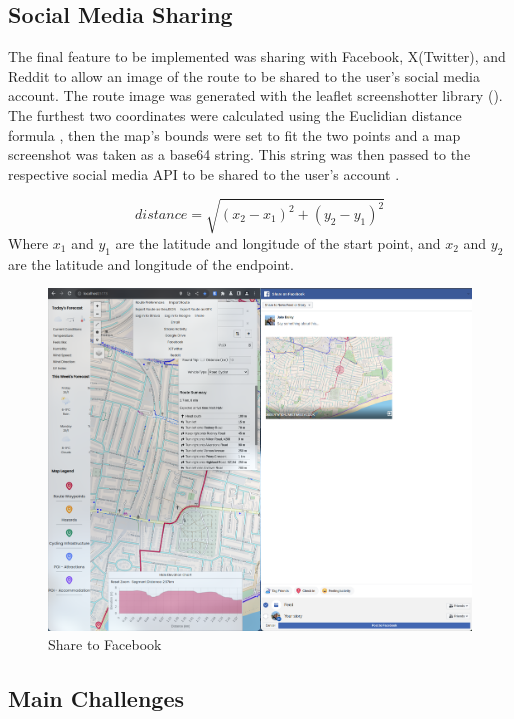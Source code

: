 \subsection{Social Media Sharing}
\label{iteration3:social-sharing}

The final feature to be implemented was sharing with Facebook, X(Twitter), and Reddit to allow an image of the route to be shared to the user's social media account. The route image was generated with the leaflet screenshotter library (\cite{noauthor_leaflet-simple-map-screenshoter_2022}). The furthest two coordinates were calculated using the Euclidian distance formula , then the map's bounds were set to fit the two points and a map screenshot was taken as a base64 string. This string was then passed to the respective social media API to be shared to the user's account .

\begin{equation}
  \label{iteration3:euclidian-distance}
  distance = \sqrt{(x_2 - x_1)^2 + (y_2 - y_1)^2}
\end{equation}
Where $x_1$ and $y_1$ are the latitude and longitude of the start point, and $x_2$ and $y_2$ are the latitude and longitude of the endpoint.

\begin{figure}[!ht]
  \includegraphics[width=425px]{figures/Progress Images/Iteration-3/SR51/SR51-Share to Facebook.png}
  \centering
  \caption{Share to Facebook}
  \label{fig:facebook-share}
\end{figure}

\subsection{Main Challenges}
\label{iteration3:main-challenges}

